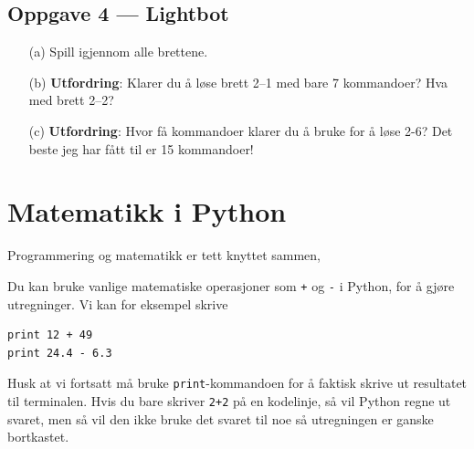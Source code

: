 \documentclass[a4paper, 11pt, notitlepage]{article}
\begin{document}
\subsection*{Oppgave 4 --- Lightbot}
\begin{itemize}
\item[(a)] Spill igjennom alle brettene.
\item[(b)] \textbf{Utfordring}: Klarer du å løse brett 2--1 med bare 7 kommandoer? Hva med brett 2--2?
\item[(c)] \textbf{Utfordring}: Hvor få kommandoer klarer du å bruke for å løse 2-6? Det beste jeg har fått til er 15 kommandoer!
\end{itemize}

\clearpage

\section*{Matematikk i Python}

Programmering og matematikk er tett knyttet sammen, 


Du kan bruke vanlige matematiske operasjoner som \verb!+! og \verb!-! i Python, for å gjøre utregninger. Vi kan for eksempel skrive
\begin{lstlisting}
print 12 + 49
print 24.4 - 6.3
\end{lstlisting}
Husk at vi fortsatt må bruke \verb+print+-kommandoen for å faktisk skrive ut resultatet til terminalen. Hvis du bare skriver \verb!2+2! på en kodelinje, så vil Python regne ut svaret, men så vil den ikke bruke det svaret til noe så utregningen er ganske bortkastet.
\end{document}
